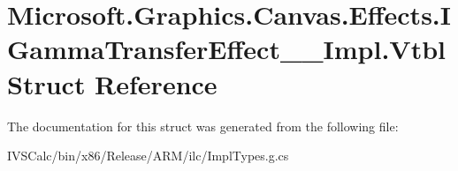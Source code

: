 \hypertarget{struct_microsoft_1_1_graphics_1_1_canvas_1_1_effects_1_1_i_gamma_transfer_effect_____impl_1_1_vtbl}{}\section{Microsoft.\+Graphics.\+Canvas.\+Effects.\+I\+Gamma\+Transfer\+Effect\+\_\+\+\_\+\+Impl.\+Vtbl Struct Reference}
\label{struct_microsoft_1_1_graphics_1_1_canvas_1_1_effects_1_1_i_gamma_transfer_effect_____impl_1_1_vtbl}


The documentation for this struct was generated from the following file\+:\begin{DoxyCompactItemize}
\item 
I\+V\+S\+Calc/bin/x86/\+Release/\+A\+R\+M/ilc/Impl\+Types.\+g.\+cs\end{DoxyCompactItemize}
